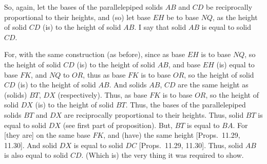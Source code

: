 \begin{Parallel}{}{}
{So, again, let the bases of the parallelepiped solids $AB$ and $CD$ be
reciprocally proportional to their heights, and (so) let base $EH$ be to base $NQ$,
as the height of solid $CD$ (is) to the height of solid $AB$. I say
that solid $AB$ is equal to solid $CD$.

For, with the same construction (as before), since as base $EH$
is to base $NQ$, so the height of solid $CD$ (is) to the height
of solid $AB$, and base $EH$ (is) equal to base $FK$, and
$NQ$ to $OR$, thus as base $FK$ is to base $OR$, so the height
of solid $CD$ (is) to the height of solid $AB$. And solids $AB$, $CD$ are the same height as (solids) $BT$,  $DX$ (respectively). 
Thus, as base $FK$ is to base $OR$, so the height of solid $DX$ (is)
to the height of solid $BT$. Thus, the bases of the parallelepiped solids $BT$ and $DX$
are reciprocally proportional to their heights. Thus, solid $BT$ is equal to
solid $DX$ (see first part of  proposition). But, $BT$ is equal to $BA$. For [they are] on the same
base $FK$, and (have) the same height [Props.~11.29, 11.30]. And solid $DX$ is equal
to solid $DC$ [Props.~11.29, 11.30]. Thus, solid $AB$ is also equal to solid $CD$. (Which is) the very thing it was required to show.}
\end{Parallel}


\vspace{7pt}{\footnotesize\noindent$^\dag$ This proposition assumes that (a) if
two parallelepipeds are equal, and have equal bases, then their heights are equal,
and (b) if the bases of two equal parallelepipeds are unequal, then that solid which
has the lesser base has the greater height.}

